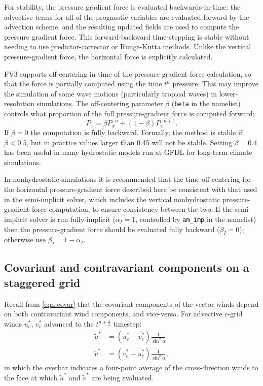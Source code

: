 \documentclass[10pt,letterpaper,margin=1in]{memoir}
\newcommand{\half}{\frac{1}{2}}
\begin{document}
For stability, the pressure gradient force is evaluated backwards-in-time: the advective terms for all of the prognostic variables are evaluated forward by the advection scheme, and the resulting updated fields are used to compute the pressure gradient force. This forward-backward time-stepping is stable without needing to use predictor-corrector or Runge-Kutta methods. Unlike the vertical pressure-gradient force, the horizontal force is explicitly calculated.

FV3 supports off-centering in time of the pressure-gradient force calculation, so that the force is partially computed using the time $t^n$ pressure. This may improve the simulation of some wave motions (particularly tropical waves) in lower-resolution simulations. The off-centering parameter $\beta$ (\texttt{beta} in the namelist) controls what proportion of the full pressure-gradient force is computed forward:
\begin{equation}
{P_x} = \beta {P_x}^{n} + \left ( 1 - \beta \right ) {P_x}^{n+1}.
\end{equation}
If $\beta = 0$ the computation is fully backward. Formally, the method is stable if $\beta < 0.5$, but in practice values larger than 0.45 will not be stable. Setting $\beta = 0.4$ has been useful in many hydrostatic models run at GFDL for long-term climate simulations.

In nonhydrostatic simulations it is recommended that the time off-centering for the horizontal pressure-gradient force described here be consistent with that used in the semi-implicit solver, which includes the vertical nonhydrostatic pressure-gradient force computation, to ensure consistency between the two. If the semi-implicit solver is run fully-implicit ($\alpha_I = 1$, controlled by \texttt{am_imp} in the namelist) then the pressure-gradient force should be evaluated fully backward ($\beta_I = 0$); otherwise use $\beta_I = 1 - \alpha_I$.


\begin{subappendices}

\section{Covariant and contravariant components on a staggered grid} \label{sec:covarcontravarstaggered}

Recall from \eqref{eqn:covar} that the covariant components of the vector winds depend on both contravariant wind components, and vice-versa. For advective c-grid winds $u_c^*$, $v_c^*$ advanced to the $t^{n+\half}$ timestep:
\begin{equation}
\begin{split}
\widetilde{u}^* &= \left ( u_c^* - \overline{v_c^*} \right ) \frac{1}{\sin^2 \alpha} \\
\widetilde{v}^* &= \left (  v_c^* - \overline{u_c^*} \right ) \frac{1}{\sin^2 \alpha},
\end{split}
\end{equation}
in which the overbar indicates a four-point average of the cross-direction winds to the face at which $\widetilde{u}^*$ and $\widetilde{v}^*$ are being evaluated.

\end{subappendices}
\end{document}

